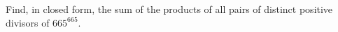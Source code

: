 Find, in closed form, the sum of the products of all pairs of distinct positive divisors of $665^{665}$.
